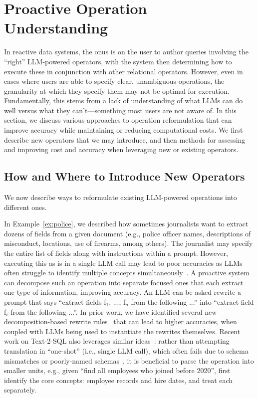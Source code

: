

\section{Proactive Operation Understanding}\label{sec:op}
In reactive data systems, the onus
is on the user to author queries involving
the ``right'' LLM-powered operators,
with the system then determining how to execute
these in conjunction with other relational operators.
However, even in cases where users
are able to specify clear, unambiguous operations,
the granularity at which they specify them may
not be optimal for execution.
Fundamentally, this stems from a lack
of understanding of what LLMs can do well
versus what they can't---something most users
are not aware of.
In this section, we discuss various 
approaches to 
operation reformulation 
that can improve accuracy 
while maintaining or reducing computational costs.
We first describe new operators that
we may introduce, and then methods for 
assessing and improving cost and accuracy when leveraging
new or existing operators.

\subsection{How and Where to Introduce New Operators}
We now describe ways to reformulate existing LLM-powered
operations into different ones. 

In Example~\ref{ex:police}, we described
how sometimes journalists want to extract
dozens of fields from a given document
(e.g., police officer names, descriptions
of misconduct, locations, use of firearms, among others).
The journalist may specify the entire list of fields
along with instructions within a prompt.
However, executing this as is in a single LLM call
may lead to poor accuracies
as LLMs often struggle to identify multiple concepts simultaneously~\cite{shankar2024docetl}.
A proactive system can decompose such an operation
into separate focused ones that
each extract one type of information, improving
accuracy.
An LLM can be asked rewrite a prompt that
says ``extract fields f$_1$, ..., f$_n$ from the following ...''
into ``extract field f$_i$ from the following ...''.
In prior work, we have identified
several new decomposition-based rewrite rules~\cite{shankar2024docetl}
that can lead to higher accuracies,
when coupled with LLMs being used to instantiate
the rewrites themselves.
Recent work on Text-2-SQL also leverages 
similar ideas~\cite{pourreza2024chase}: 
rather than attempting translation 
in ``one-shot'' (i.e., single LLM call), 
which often fails due to schema mismatches 
or poorly-named schemas~\cite{luoma2025snails}, 
it is beneficial to 
parse the operation into smaller units, e.g.,
given ``find all employees who joined before 2020'', 
first identify the core concepts: employee records 
and hire dates,
and treat each separately.

